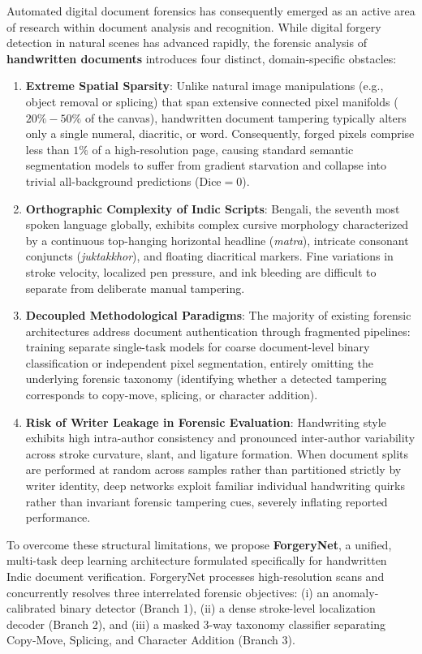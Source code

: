 \documentclass[runningheads]{llncs}
\begin{document}
Automated digital document forensics has consequently emerged as an active area of research within document analysis and recognition. While digital forgery detection in natural scenes has advanced rapidly, the forensic analysis of \textbf{handwritten documents} introduces four distinct, domain-specific obstacles:
\begin{enumerate}[1.]
    \item \textbf{Extreme Spatial Sparsity}: Unlike natural image manipulations (e.g., object removal or splicing) that span extensive connected pixel manifolds ($20\%-50\%$ of the canvas), handwritten document tampering typically alters only a single numeral, diacritic, or word. Consequently, forged pixels comprise less than $1\%$ of a high-resolution page, causing standard semantic segmentation models to suffer from gradient starvation and collapse into trivial all-background predictions ($\text{Dice} = 0$).
    \item \textbf{Orthographic Complexity of Indic Scripts}: Bengali, the seventh most spoken language globally, exhibits complex cursive morphology characterized by a continuous top-hanging horizontal headline (\textit{matra}), intricate consonant conjuncts (\textit{juktakkhor}), and floating diacritical markers. Fine variations in stroke velocity, localized pen pressure, and ink bleeding are difficult to separate from deliberate manual tampering.
    \item \textbf{Decoupled Methodological Paradigms}: The majority of existing forensic architectures address document authentication through fragmented pipelines: training separate single-task models for coarse document-level binary classification or independent pixel segmentation, entirely omitting the underlying forensic taxonomy (identifying whether a detected tampering corresponds to copy-move, splicing, or character addition).
    \item \textbf{Risk of Writer Leakage in Forensic Evaluation}: Handwriting style exhibits high intra-author consistency and pronounced inter-author variability across stroke curvature, slant, and ligature formation. When document splits are performed at random across samples rather than partitioned strictly by writer identity, deep networks exploit familiar individual handwriting quirks rather than invariant forensic tampering cues, severely inflating reported performance.
\end{enumerate}

To overcome these structural limitations, we propose \textbf{ForgeryNet}, a unified, multi-task deep learning architecture formulated specifically for handwritten Indic document verification. ForgeryNet processes high-resolution scans and concurrently resolves three interrelated forensic objectives: (i) an anomaly-calibrated binary detector (Branch 1), (ii) a dense stroke-level localization decoder (Branch 2), and (iii) a masked 3-way taxonomy classifier separating Copy-Move, Splicing, and Character Addition (Branch 3).
\end{document}
